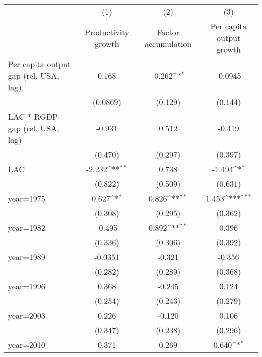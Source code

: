 {
\def\sym#1{\ifmmode^{#1}\else\(^{#1}\)\fi}
\begin{tabular}{l*{3}{c}}
\hline\hline
                    &\multicolumn{1}{c}{(1)}&\multicolumn{1}{c}{(2)}&\multicolumn{1}{c}{(3)}\\
                    &\multicolumn{1}{c}{Productivity growth}&\multicolumn{1}{c}{Factor accumulation}&\multicolumn{1}{c}{Per capita output growth}\\
\hline
Per capita output gap (rel. USA, lag)&       0.168         &      -0.262\sym{*}  &     -0.0945         \\
                    &    (0.0869)         &     (0.129)         &     (0.144)         \\
[1em]
LAC * RGDP gap (rel. USA, lag)&      -0.931         &       0.512         &      -0.419         \\
                    &     (0.470)         &     (0.297)         &     (0.397)         \\
[1em]
LAC                 &      -2.232\sym{**} &       0.738         &      -1.494\sym{*}  \\
                    &     (0.822)         &     (0.509)         &     (0.631)         \\
[1em]
year=1975           &       0.627\sym{*}  &       0.826\sym{**} &       1.453\sym{***}\\
                    &     (0.308)         &     (0.295)         &     (0.362)         \\
[1em]
year=1982           &      -0.495         &       0.892\sym{**} &       0.396         \\
                    &     (0.336)         &     (0.306)         &     (0.392)         \\
[1em]
year=1989           &     -0.0351         &      -0.321         &      -0.356         \\
                    &     (0.282)         &     (0.289)         &     (0.368)         \\
[1em]
year=1996           &       0.368         &      -0.245         &       0.124         \\
                    &     (0.254)         &     (0.243)         &     (0.279)         \\
[1em]
year=2003           &       0.226         &      -0.120         &       0.106         \\
                    &     (0.347)         &     (0.238)         &     (0.296)         \\
[1em]
year=2010           &       0.371         &       0.269         &       0.640\sym{*}  \\

\end{tabular}}
